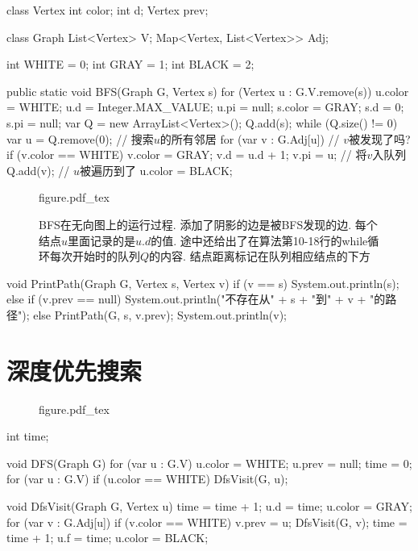 \documentclass[oneside,10pt,fontset=none]{ctexbook}
\numberwithin{definition}{chapter}
\numberwithin{theorem}{chapter}
\numberwithin{lemma}{chapter}
\begin{document}
\begin{myjava}{}{}
class Vertex {
    int color;
    int d;
    Vertex prev;
}

class Graph {
    List<Vertex> V;
    Map<Vertex, List<Vertex>> Adj;
}


int WHITE = 0;
int GRAY  = 1;
int BLACK = 2;

public static void BFS(Graph G, Vertex s) {
    for (Vertex u : G.V.remove(s)) {
        u.color = WHITE;
        u.d = Integer.MAX_VALUE;
        u.pi = null;
    }
    s.color = GRAY;
    s.d = 0;
    s.pi = null;
    var Q = new ArrayList<Vertex>();
    Q.add(s);
    while (Q.size() != 0) {
        var u = Q.remove(0);
        // 搜索$u$的所有邻居
        for (var v : G.Adj[u]) {
            // $v$被发现了吗?
            if (v.color == WHITE) {
                v.color = GRAY;
                v.d = u.d + 1;
                v.pi = u;
                // 将$v$入队列
                Q.add(v);
            }
        }
        // $u$被遍历到了
        u.color = BLACK;
    }
}
\end{myjava}

\begin{figure}[htbp]
    \def\svgwidth{\columnwidth}
    {figure.pdf_tex}
    \caption{BFS在无向图上的运行过程. 添加了阴影的边是被BFS发现的边. 每个结点$u$里面记录的是$u.d$的值. 途中还给出了在算法第10-18行的while循环每次开始时的队列$Q$的内容. 结点距离标记在队列相应结点的下方}
\end{figure}

\begin{myjava}{}{}
void PrintPath(Graph G, Vertex s, Vertex v) {
    if (v == s)
        System.out.println(s);
    else if (v.prev == null)
        System.out.println("不存在从" + s + "到" + v + "的路径");
    else {
        PrintPath(G, s, v.prev);
        System.out.println(v);
    }
}
\end{myjava}

\chapter{深度优先搜索}

\begin{figure}[htbp]
    \def\svgwidth{\columnwidth}
    {figure.pdf_tex}
\end{figure}

\begin{myjava}{}{}
int time;

void DFS(Graph G) {
    for (var u : G.V) {
        u.color = WHITE;
        u.prev = null;
    }
    time = 0;
    for (var u : G.V) {
        if (u.color == WHITE)
            DfsVisit(G, u);
    }
}

void DfsVisit(Graph G, Vertex u) {
    time = time + 1;
    u.d = time;
    u.color = GRAY;
    for (var v : G.Adj[u]) {
        if (v.color == WHITE) {
            v.prev = u;
            DfsVisit(G, v);
        }
    }
    time = time + 1;
    u.f = time;
    u.color = BLACK;
}
\end{myjava}
\end{document}
